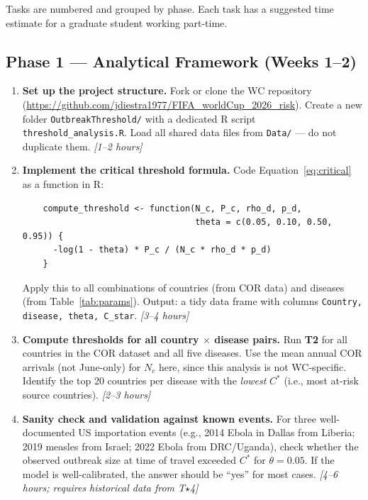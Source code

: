 \documentclass[12pt]{article}
\begin{document}
Tasks are numbered and grouped by phase. Each task has a suggested
time estimate for a graduate student working part-time.

\subsection{Phase 1 --- Analytical Framework (Weeks 1--2)}

\begin{enumerate}[label=\textbf{T\arabic*.}]

  \item \textbf{Set up the project structure.}
    Fork or clone the WC repository
    (\url{https://github.com/jdiestra1977/FIFA_worldCup_2026_risk}).
    Create a new folder \texttt{OutbreakThreshold/} with a
    dedicated R script \texttt{threshold\_analysis.R}.
    Load all shared data files from \texttt{Data/} --- do not
    duplicate them.
    \textit{[1--2 hours]}

  \item \textbf{Implement the critical threshold formula.}
    Code Equation~\ref{eq:critical} as a function in R:
    \begin{verbatim}
    compute_threshold <- function(N_c, P_c, rho_d, p_d,
                                  theta = c(0.05, 0.10, 0.50, 0.95)) {
      -log(1 - theta) * P_c / (N_c * rho_d * p_d)
    }
    \end{verbatim}
    Apply this to all combinations of countries (from COR data)
    and diseases (from Table~\ref{tab:params}).
    Output: a tidy data frame with columns
    \texttt{Country, disease, theta, C\_star}.
    \textit{[3--4 hours]}

  \item \textbf{Compute thresholds for all country $\times$ disease pairs.}
    Run \textbf{T2} for all countries in the COR dataset and all
    five diseases. Use the mean annual COR arrivals (not June-only)
    for $N_c$ here, since this analysis is not WC-specific.
    Identify the top 20 countries per disease with the \emph{lowest}
    $C^*$ (i.e., most at-risk source countries).
    \textit{[2--3 hours]}

  \item \textbf{Sanity check and validation against known events.}
    \label{sec:validation}
    For three well-documented US importation events (e.g.,
    2014 Ebola in Dallas from Liberia; 2019 measles from Israel;
    2022 Ebola from DRC/Uganda), check whether the observed outbreak
    size at time of travel exceeded $C^*$ for $\theta = 0.05$.
    If the model is well-calibrated, the answer should be ``yes''
    for most cases.
    \textit{[4--6 hours; requires historical data from T$\star$4]}

\end{enumerate}
\end{document}
